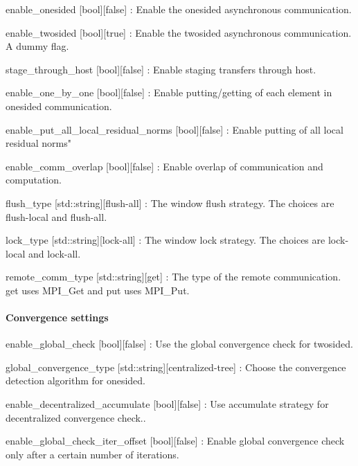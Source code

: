 \begin{DoxyItemize}
\item {\ttfamily enable\+\_\+onesided} \mbox{[}bool\mbox{]}\mbox{[}false\mbox{]} \+: Enable the onesided asynchronous communication.
\item {\ttfamily enable\+\_\+twosided} \mbox{[}bool\mbox{]}\mbox{[}true\mbox{]} \+: Enable the twosided asynchronous communication. A dummy flag.
\item {\ttfamily stage\+\_\+through\+\_\+host} \mbox{[}bool\mbox{]}\mbox{[}false\mbox{]} \+: Enable staging transfers through host.
\item {\ttfamily enable\+\_\+one\+\_\+by\+\_\+one} \mbox{[}bool\mbox{]}\mbox{[}false\mbox{]} \+: Enable putting/getting of each element in onesided communication.
\item {\ttfamily enable\+\_\+put\+\_\+all\+\_\+local\+\_\+residual\+\_\+norms} \mbox{[}bool\mbox{]}\mbox{[}false\mbox{]} \+: Enable putting of all local residual norms"
\item {\ttfamily enable\+\_\+comm\+\_\+overlap} \mbox{[}bool\mbox{]}\mbox{[}false\mbox{]} \+: Enable overlap of communication and computation.
\item {\ttfamily flush\+\_\+type} \mbox{[}std\+::string\mbox{]}\mbox{[}flush-\/all\mbox{]} \+: The window flush strategy. The choices are {\ttfamily flush-\/local} and {\ttfamily flush-\/all}.
\item {\ttfamily lock\+\_\+type} \mbox{[}std\+::string\mbox{]}\mbox{[}lock-\/all\mbox{]} \+: The window lock strategy. The choices are {\ttfamily lock-\/local} and {\ttfamily lock-\/all}.
\item {\ttfamily remote\+\_\+comm\+\_\+type} \mbox{[}std\+::string\mbox{]}\mbox{[}get\mbox{]} \+: The type of the remote communication. {\ttfamily get} uses {\ttfamily M\+P\+I\+\_\+\+Get} and {\ttfamily put} uses {\ttfamily M\+P\+I\+\_\+\+Put}.
\end{DoxyItemize}

\paragraph*{Convergence settings}


\begin{DoxyItemize}
\item {\ttfamily enable\+\_\+global\+\_\+check} \mbox{[}bool\mbox{]}\mbox{[}false\mbox{]} \+: Use the global convergence check for twosided.
\item {\ttfamily global\+\_\+convergence\+\_\+type} \mbox{[}std\+::string\mbox{]}\mbox{[}centralized-\/tree\mbox{]} \+: Choose the convergence detection algorithm for onesided.
\item {\ttfamily enable\+\_\+decentralized\+\_\+accumulate} \mbox{[}bool\mbox{]}\mbox{[}false\mbox{]} \+: Use accumulate strategy for decentralized convergence check..
\item {\ttfamily enable\+\_\+global\+\_\+check\+\_\+iter\+\_\+offset} \mbox{[}bool\mbox{]}\mbox{[}false\mbox{]} \+: Enable global convergence check only after a certain number of iterations.
\end{DoxyItemize}


